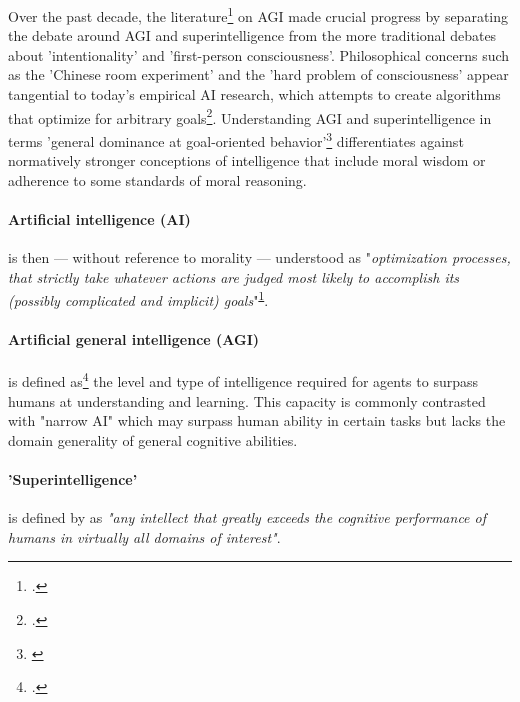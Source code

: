 \documentclass[12pt, a4paper]{article}
\begin{document}
			Over the past decade, the literature\footcite{armstrong2013general} on AGI made crucial progress by separating the debate around AGI and superintelligence from the more traditional debates about 'intentionality' and 'first-person consciousness'.
			Philosophical concerns such as the 'Chinese room experiment' and the 'hard problem of consciousness' appear tangential to today's empirical AI research, which attempts to create algorithms that optimize for arbitrary goals\footcite{bostrom2012superintelligent}.
			Understanding AGI and superintelligence in terms 'general dominance at goal-oriented behavior'\footnote{\cite{bostrom2014superintelligence} \label{bostrom}} differentiates against normatively stronger conceptions of intelligence  that include moral wisdom or adherence to some standards of moral reasoning.
			
			\paragraph[Definition of artificial intelligence]{Artificial intelligence (AI)}
				is then --- without reference to morality --- understood as "\textit{optimization processes, that strictly take whatever actions are 	judged most likely to accomplish its (possibly complicated and implicit) goals}"\textsuperscript{\ref{bostrom}}.

			\paragraph[Definition of transformative AGI]{Artificial general intelligence (AGI)} 
				is defined as\footcite{goertzel2007artificial} the level and type of intelligence required for agents to surpass humans at understanding and learning.
				This capacity is commonly contrasted with "narrow AI" which may surpass human ability in certain tasks but lacks the domain generality of general cognitive abilities.
			
			\paragraph[Definition of superintelligence]{'Superintelligence'}
				is defined by \cite{bostrom2014superintelligence} as \textit{"any intellect that greatly exceeds the cognitive performance of humans in virtually all domains of interest"}.
\end{document}
